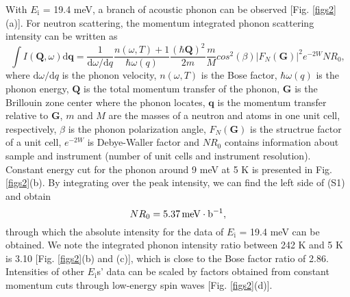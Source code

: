 \documentclass[%
reprint,
superscriptaddress,
amsmath,amssymb,
aps,
prb,
]{revtex4-2}
\begin{document}
	With $E_\mathrm{i}$ = 19.4 meV, a branch of acoustic phonon can be observed [Fig. \ref{figs2}(a)]. For neutron scattering, the momentum integrated phonon scattering intensity can be written as \cite{XuRSI2013}
	\begin{equation}
		\int{I(\textbf{Q},\omega)\mathrm{d}\textbf{q}}=\frac{1}{\mathrm{d}\omega/\mathrm{d}q}\frac{n(\omega, T)+1}{\hbar\omega(q)}\frac{(\hbar \textbf{Q})^2}{2m}\frac{m}{M}cos^2(\beta)|F_N(\textbf{G})|^2 e^{-2W} NR_0,
	\end{equation}
	where $\mathrm{d}\omega/\mathrm{d}q$ is the phonon velocity, $n(\omega, T)$ is the Bose factor, $\hbar\omega(q)$ is the phonon energy, $\textbf{Q}$ is the total momentum transfer of the phonon, $\textbf{G}$ is the Brillouin zone center where the phonon locates, $\textbf{q}$ is the momentum transfer relative to $\textbf{G}$, $m$ and $M$ are the masses of a neutron and atoms in one unit cell, respectively, $\beta$ is the phonon polarization angle, $F_N(\textbf{G})$ is the structrue factor of a unit cell, $e^{-2W}$ is Debye-Waller factor and $NR_0$ contains information about sample and instrument (number of unit cells and instrument resolution).
	Constant energy cut for the phonon around 9 meV at 5 K is presented in Fig. \ref{figs2}(b). By integrating over the peak intensity, we can find the left side of (S1) and obtain
	\begin{equation}
		NR_0 = 5.37\,{\rm meV} \cdot {\rm b^{-1}},
	\end{equation}
	through which the absolute intensity for the data of $E_\mathrm{i}$ = 19.4 meV can be obtained. We note the integrated phonon intensity ratio between 242 K and 5 K is 3.10 [Fig. \ref{figs2}(b) and (c)], which is close to the Bose factor ratio of 2.86. Intensities of other $E_\mathrm{i}$s' data can be scaled by factors obtained from constant momentum cuts through low-energy spin waves [Fig. \ref{figs2}(d)].
	
\end{document}
